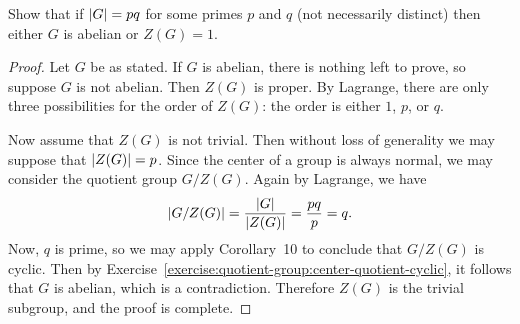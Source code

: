  Show that if $\lvert{G}\rvert = pq$ for some primes $p$ and $q$
(not necessarily distinct) then either $G$ is abelian or $Z(G) = 1$.
\begin{proof}
  Let $G$ be as stated. If $G$ is abelian, there is nothing left to
  prove, so suppose $G$ is not abelian. Then $Z(G)$ is proper. By
  Lagrange, there are only three possibilities for the order of
  $Z(G)$: the order is either $1$, $p$, or $q$.

  Now assume that $Z(G)$ is not trivial. Then without loss of
  generality we may suppose that $\lvert{Z(G)}\rvert = p$. Since the center of
  a group is always normal, we may consider the quotient group
  $G/Z(G)$. Again by Lagrange, we have
  \begin{equation*}
    \lvert{G/Z(G)}\rvert = \frac{\lvert{G}\rvert}{\lvert{Z(G)}\rvert} = \frac{pq}p = q.
  \end{equation*}
  Now, $q$ is prime, so we may apply Corollary~10 to conclude that
  $G/Z(G)$ is cyclic. Then by
  Exercise~\ref{exercise:quotient-group:center-quotient-cyclic}, it
  follows that $G$ is abelian, which is a contradiction. Therefore
  $Z(G)$ is the trivial subgroup, and the proof is complete.
\end{proof}
